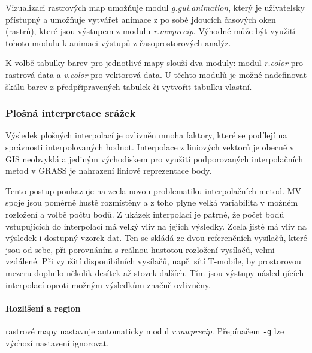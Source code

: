 \documentclass[a4paper,12pt,oneside]{report}
\begin{document}
Vizualizaci rastrových map umožňuje modul \textit{g.gui.animation}, který je
 uživatelsky přístupný a umožňuje vytvářet animace z
po sobě jdoucích časových oken (rastrů), které jsou výstupem z modulu \textit{r.mwprecip}. 
Výhodné může být využití tohoto modulu k animaci výstupů z časoprostorových analýz.

K volbě tabulky barev pro jednotlivé mapy slouží dva moduly: modul \textit{r.color} pro rastrová data
a \textit{v.color} pro vektorová data. U těchto modulů je možné
nadefinovat škálu barev z předpřipravených tabulek či vytvořit
tabulku vlastní.

\subsubsection{Plošná interpretace srážek}
Výsledek plošných interpolací je ovlivněn mnoha faktory, které se
podílejí na správnosti interpolovaných hodnot.  Interpolace z
liniových vektorů je obecně v GIS neobvyklá a jediným východiskem pro
využití podporovaných interpolačních metod v GRASS je nahrazení
liniové reprezentace body.

Tento postup poukazuje na zcela novou problematiku interpolačních
metod. MV spoje jsou poměrně hustě rozmístěny a z toho plyne velká
variabilita v možném rozložení a volbě počtu bodů. Z ukázek
interpolací je patrné, že počet bodů vstupujících do interpolací má
velký vliv na jejich výsledky. Zcela jistě má vliv na výsledek i
dostupný vzorek dat. Ten se skládá ze dvou referenčních vysílačů,
které jsou od sebe, při porovnáním s reálnou hustotou rozložení
vysílačů, velmi vzdálené. Při využití disponibilních vysílačů, např.
sítí T-mobile, by prostorovou mezeru doplnilo několik desítek až
stovek dalších. Tím jsou výstupy následujících interpolací oproti
možným výsledkům značně ovlivněny. 


\paragraph*{Rozlišení a region} rastrové mapy nastavuje automaticky
modul \textit{r.mwprecip}. Přepínačem \texttt{-g} lze výchozí
nastavení ignorovat. 


\end{document}
